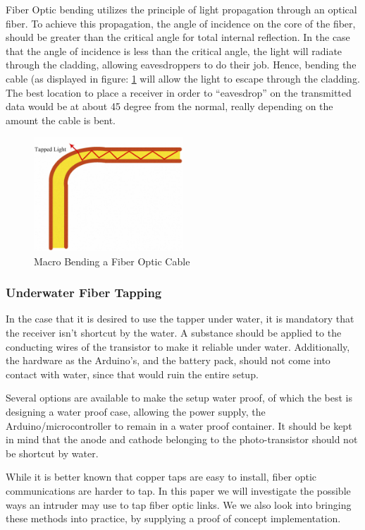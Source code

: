 \documentclass[11pt,twoside,a4paper]{scrartcl}
\begin{document}
Fiber Optic bending utilizes the principle of light propagation through an optical fiber.
To achieve this propagation, the angle of incidence on the core of the fiber,
should be greater than the critical angle for total internal reflection.
In the case that the angle of incidence is less than the critical angle, the light will radiate through the cladding,
allowing eavesdroppers to do their job. Hence, bending the cable (as displayed in figure: \ref{fig:bending} will allow the light to escape through the cladding.
The best location to place a receiver in order to ``eavesdrop'' on the transmitted data would be at about 45 degree from the normal,
really depending on the amount the cable is bent. 
\begin{figure}[htbp]
	\centering
	\includegraphics[width=0.5\textwidth]{bending}
	\caption{Macro Bending a Fiber Optic Cable}
	\label{fig:bending}
\end{figure}

\subsubsection{Underwater Fiber Tapping}
In the case that it is desired to use the tapper under water, it is mandatory that the receiver isn't shortcut by the water. A substance should be applied to the conducting wires of the transistor to make it reliable under water.
Additionally, the hardware as the Arduino's, and the battery pack,
should not come into contact with water, since that would ruin the entire setup. 

Several options are available to make the setup water proof, of which the best is designing a water proof case, allowing the power supply,
the Arduino/microcontroller to remain in a water proof container.
It should be kept in mind that the anode and cathode belonging to the photo-transistor should not be shortcut by water.

	While it is better known that copper taps are easy to install, fiber optic communications are harder to tap.
	In this paper we will investigate the possible ways an intruder may use to tap fiber optic links.
	We we also look into bringing these methods into practice, by supplying a proof of concept implementation.
\end{document}
